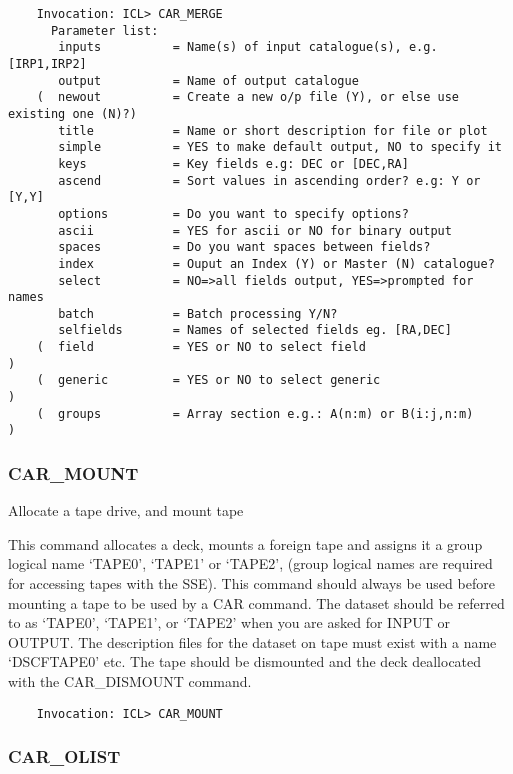 \begin{verbatim}
    Invocation: ICL> CAR_MERGE
      Parameter list:
       inputs          = Name(s) of input catalogue(s), e.g. [IRP1,IRP2]
       output          = Name of output catalogue
    (  newout          = Create a new o/p file (Y), or else use existing one (N)?)
       title           = Name or short description for file or plot
       simple          = YES to make default output, NO to specify it
       keys            = Key fields e.g: DEC or [DEC,RA]
       ascend          = Sort values in ascending order? e.g: Y or [Y,Y]
       options         = Do you want to specify options?
       ascii           = YES for ascii or NO for binary output
       spaces          = Do you want spaces between fields?
       index           = Ouput an Index (Y) or Master (N) catalogue?
       select          = NO=>all fields output, YES=>prompted for names
       batch           = Batch processing Y/N?
       selfields       = Names of selected fields eg. [RA,DEC]
    (  field           = YES or NO to select field                               )
    (  generic         = YES or NO to select generic                             )
    (  groups          = Array section e.g.: A(n:m) or B(i:j,n:m)                )
\end{verbatim}

\subsubsection{CAR\_MOUNT}

Allocate a tape drive, and mount tape

This command allocates a deck, mounts a foreign tape and assigns it
a group logical name `TAPE0', `TAPE1' or `TAPE2', (group logical names are
required for accessing tapes with the SSE).
This command should always be used before mounting a tape to be used by a CAR
command.
The dataset should be referred to as `TAPE0', `TAPE1', or `TAPE2' when you are
asked for INPUT or OUTPUT.
The description files for the dataset on tape must exist with a name
`DSCFTAPE0' etc.
The tape should be dismounted and the deck deallocated with the CAR\_DISMOUNT
command.
\begin{verbatim}
    Invocation: ICL> CAR_MOUNT
\end{verbatim}

\subsubsection{CAR\_OLIST}

